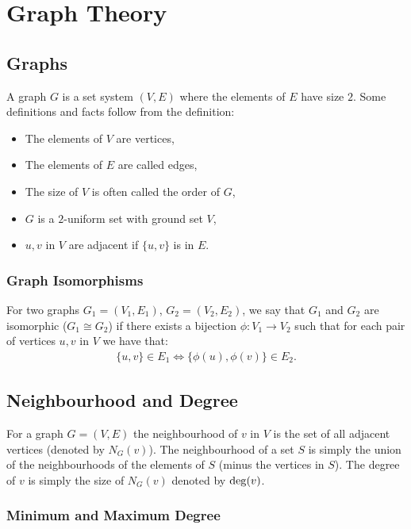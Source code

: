 \section{Graph Theory}

\subsection{Graphs}

A graph $G$ is a set system $(V, E)$ where the elements of $E$ have
size $2$. Some definitions and facts follow from the definition:
\begin{itemize}
  \item The elements of $V$ are vertices,
  \item The elements of $E$ are called edges,
  \item The size of $V$ is often called the order of $G$,
  \item $G$ is a $2$-uniform set with ground set $V$,
  \item $u, v$ in $V$ are adjacent if $\{u, v\}$ is in $E$.
\end{itemize}  

\subsubsection{Graph Isomorphisms}

For two graphs $G_1 = (V_1, E_1)$, $G_2 = (V_2, E_2)$, we say that
$G_1$ and $G_2$ are isomorphic ($G_1 \cong G_2$) if there exists a
bijection $\phi : V_1 \to V_2$ such that for each pair of vertices
$u, v$ in $V$ we have that: \begin{gather*}
  \{u, v\} \in E_1 \Longleftrightarrow \{\phi(u), \phi(v)\} \in E_2.
\end{gather*}

\subsection{Neighbourhood and Degree}

For a graph $G = (V, E)$ the neighbourhood of $v$ in $V$ 
is the set of all adjacent vertices (denoted by $N_G(v)$). The
neighbourhood of a set $S$ is simply the union of the neighbourhoods
of the elements of $S$ (minus the vertices in $S$).
The degree of $v$ is simply the size of $N_G(v)$ denoted 
by $\operatorname{deg}(v)$.

\subsubsection{Minimum and Maximum Degree}

